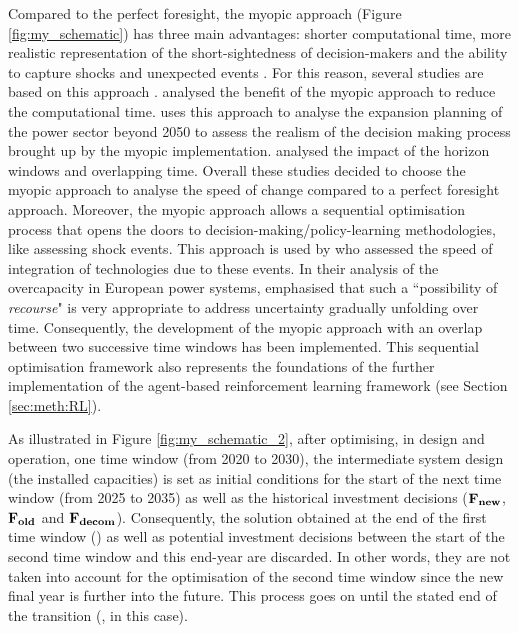 \noindent
Compared to the perfect foresight, the myopic approach (Figure \ref{fig:my_schematic}) has three main advantages: shorter computational time, more realistic representation of the short-sightedness of decision-makers and the ability to capture shocks and unexpected events \cite{mccollum2020energy}. For this reason, several studies are based on this approach \citep{babrowski2014reducing,poncelet2016myopic,nerini2017myopic,heuberger2018impact}. \citet{babrowski2014reducing} analysed the benefit of the myopic approach to reduce the computational time. \citet{poncelet2016myopic} uses this approach to analyse the expansion planning of the power sector beyond 2050 to assess the realism of the decision making process brought up by the myopic implementation. \citet{nerini2017myopic} analysed the impact of the horizon windows and overlapping time.  Overall these studies decided to choose the myopic approach to analyse the speed of change compared to a perfect foresight approach.
Moreover, the myopic approach allows a sequential optimisation process that opens the doors to decision-making/policy-learning methodologies, like assessing shock events. This approach is used by \citet{heuberger2018impact} who assessed the speed of integration of technologies due to these events. 
In their analysis of the overcapacity in European power systems, \citet{moret2020overcapacity} emphasised that such a ``possibility of \textit{recourse}" is very appropriate to address uncertainty gradually unfolding over time. Consequently, the development of the myopic approach with an overlap between two successive time windows has been implemented. This sequential optimisation framework also represents the foundations of the further implementation of the agent-based reinforcement learning framework (see Section \ref{sec:meth:RL}).

As illustrated in Figure \ref{fig:my_schematic_2}, after optimising, in design and operation, one time window (\eg from 2020 to 2030), the intermediate system design (\ie the installed capacities) is set as initial conditions for the start of the next time window (\eg from 2025 to 2035) as well as the historical investment decisions (\ie $\textbf{F\textsubscript{new}}$, $\textbf{F\textsubscript{old}}$ and $\textbf{F\textsubscript{decom}}$). Consequently, the solution obtained at the end of the first time window () as well as potential investment decisions between the start of the second time window and this end-year are discarded. In other words, they are not taken into account for the optimisation of the second time window since the new final year is further into the future. This process goes on until the stated end of the transition (, in this case).

